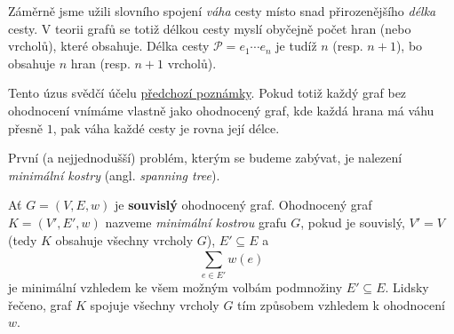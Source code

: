 \begin{remark}
 Záměrně jsme užili slovního spojení \emph{váha} cesty místo snad přirozenějšího
 \emph{délka} cesty. V teorii grafů se totiž délkou cesty myslí obyčejně počet
 hran (nebo vrcholů), které obsahuje. Délka cesty $\mathcal{P} = e_1 \cdots e_n$
 je tudíž $n$ (resp. $n + 1$), bo obsahuje $n$ hran (resp. $n + 1$ vrcholů).

 Tento úzus svědčí účelu \hyperref[rmrk:ohodnoceni-neohodnoceneho]{předchozí
 poznámky}. Pokud totiž každý graf bez ohodnocení vnímáme vlastně jako
 ohodnocený graf, kde každá hrana má váhu přesně $1$, pak váha každé cesty je
 rovna její délce.
\end{remark}

První (a nejjednodušší) problém, kterým se budeme zabývat, je nalezení
\emph{minimální kostry} (angl. \emph{spanning tree}).

\begin{definition}
\label{def:minimalni-kostra}
 Ať $G = (V,E,w)$ je \textbf{souvislý} ohodnocený graf. Ohodnocený graf $K =
 (V',E',w)$ nazveme \emph{minimální kostrou} grafu $G$, pokud je souvislý, $V' =
 V$ (tedy $K$ obsahuje všechny vrcholy $G$), $E' \subseteq E$ a
 \[
  \sum_{e \in E'}^{} w(e)
 \]
 je minimální vzhledem ke všem možným volbám podmnožiny $E' \subseteq E$.
 Lidsky řečeno, graf $K$ spojuje všechny vrcholy $G$ tím 
 způsobem vzhledem k ohodnocení $w$.
\end{definition}


